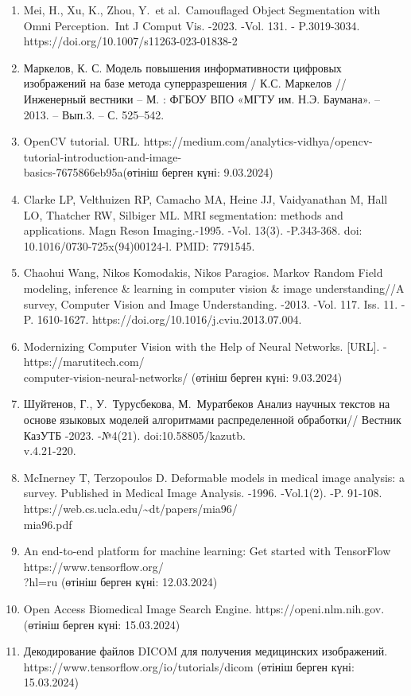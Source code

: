   \begin{noparindent}

\begin{enumerate}
\def\labelenumi{\arabic{enumi}.}
\item
  Mei, H., Xu, K., Zhou, Y.~et al.~Camouflaged Object Segmentation with
  Omni Perception.~Int J Comput Vis. -2023. -Vol. 131. - P.3019-3034.
  https://doi.org/10.1007/s11263-023-01838-2
\item
  Маркелов, К. С. Модель повышения информативности цифровых изображений
  на базе метода суперразрешения / К.С. Маркелов // Инженерный вестники
  -- М. : ФГБОУ ВПО «МГТУ им. Н.Э. Баумана». -- 2013. -- Вып.3. -- С.
  525--542.
\item
  OpenCV tutorial. URL.
  https://medium.com/analytics-vidhya/opencv-tutorial-introduction-and-image-\\basics-7675866eb95a(өтініш
  берген күні: 9.03.2024)
\item
  Clarke LP, Velthuizen RP, Camacho MA, Heine JJ, Vaidyanathan M, Hall
  LO, Thatcher RW, Silbiger ML. MRI segmentation: methods and
  applications. Magn Reson Imaging.-1995. -Vol. 13(3). -P.343-368. doi:
  10.1016/0730-725x(94)00124-l. PMID: 7791545.
\item
  Chaohui Wang, Nikos Komodakis, Nikos Paragios. Markov Random Field
  modeling, inference \& learning in computer vision \& image
  understanding//A survey, Computer Vision and Image Understanding.
  -2013. -Vol. 117. Iss. 11. -P. 1610-1627.
  https://doi.org/10.1016/j.cviu.2013.07.004.
\item
  Modernizing Computer Vision with the Help of Neural Networks.
  {[}URL{]}. - https://marutitech.com/\\computer-vision-neural-networks/
  (өтініш берген күні: 9.03.2024)
\item
  Шуйтенов, Г., У.~Турусбекова, М.~Муратбеков Анализ научных текстов на
  основе языковых моделей алгоритмами распределенной обработки// Вестник
  КазУТБ -2023. -№4(21). doi:10.58805/kazutb.\\v.4.21-220.
\item
  McInerney T, Terzopoulos D. Deformable models in medical image
  analysis: a survey. Published in Medical Image Analysis. -1996.
  -Vol.1(2). -P. 91-108.
  https://web.cs.ucla.edu/\textasciitilde dt/papers/mia96/\\mia96.pdf
\item
  An end-to-end platform for machine learning: Get started with
  TensorFlow https://www.tensorflow.org/\\?hl=ru (өтініш берген күні:
  12.03.2024)
\item
  Open Access Biomedical Image Search Engine. https://openi.nlm.nih.gov.
  \\(өтініш берген күні: 15.03.2024)
\item
  Декодирование файлов DICOM для получения медицинских изображений.
 \\ https://www.tensorflow.org/io/tutorials/dicom (өтініш берген күні:
  15.03.2024)
\end{enumerate}
\end{noparindent}


